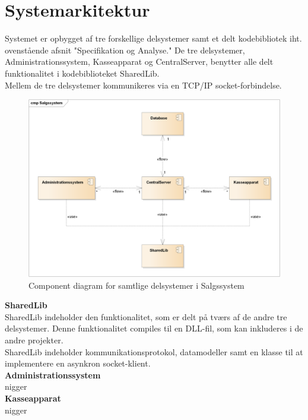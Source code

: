 \section{Systemarkitektur}
Systemet er opbygget af tre forskellige delsystemer samt et delt kodebibliotek iht. ovenstående afsnit "Specifikation og Analyse." De tre delsystemer, Administrationssystem, Kasseapparat og CentralServer, benytter alle delt funktionalitet i kodebiblioteket SharedLib.\\

Mellem de tre delsystemer kommunikeres via en TCP/IP socket-forbindelse.

\begin{figure}[H]
    \centering
    \includegraphics[width=1\textwidth]{Projektbeskrivelse/Systemarkitektur/Components.png}
    \caption{Component diagram for samtlige delsystemer i Salgssystem}
    \label{fig:CSLogging}
\end{figure}


\textbf{SharedLib}\\
SharedLib indeholder den funktionalitet, som er delt på tværs af de andre tre delsystemer. Denne funktionalitet compiles til en DLL-fil, som kan inkluderes i de andre projekter.\\

SharedLib indeholder kommunikationsprotokol, datamodeller samt en klasse til at implementere en asynkron socket-klient.\\

\textbf{Administrationssystem}\\
nigger\\

\textbf{Kasseapparat}\\
nigger\\

